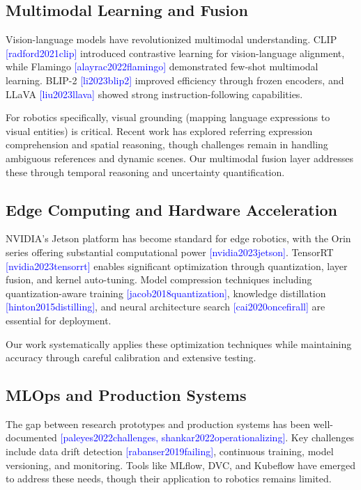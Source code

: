 \documentclass[conference]{IEEEtran}
\newcommand{\cite}[1]{\textcolor{blue}{[#1]}}
\begin{document}
\subsection{Multimodal Learning and Fusion}

Vision-language models have revolutionized multimodal understanding. CLIP \cite{radford2021clip} introduced contrastive learning for vision-language alignment, while Flamingo \cite{alayrac2022flamingo} demonstrated few-shot multimodal learning. BLIP-2 \cite{li2023blip2} improved efficiency through frozen encoders, and LLaVA \cite{liu2023llava} showed strong instruction-following capabilities.

For robotics specifically, visual grounding (mapping language expressions to visual entities) is critical. Recent work has explored referring expression comprehension and spatial reasoning, though challenges remain in handling ambiguous references and dynamic scenes. Our multimodal fusion layer addresses these through temporal reasoning and uncertainty quantification.

\subsection{Edge Computing and Hardware Acceleration}

NVIDIA's Jetson platform has become standard for edge robotics, with the Orin series offering substantial computational power \cite{nvidia2023jetson}. TensorRT \cite{nvidia2023tensorrt} enables significant optimization through quantization, layer fusion, and kernel auto-tuning. Model compression techniques including quantization-aware training \cite{jacob2018quantization}, knowledge distillation \cite{hinton2015distilling}, and neural architecture search \cite{cai2020oncefirall} are essential for deployment.

Our work systematically applies these optimization techniques while maintaining accuracy through careful calibration and extensive testing.

\subsection{MLOps and Production Systems}

The gap between research prototypes and production systems has been well-documented \cite{paleyes2022challenges, shankar2022operationalizing}. Key challenges include data drift detection \cite{rabanser2019failing}, continuous training, model versioning, and monitoring. Tools like MLflow, DVC, and Kubeflow have emerged to address these needs, though their application to robotics remains limited.
\end{document}
